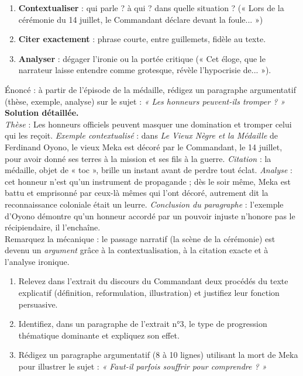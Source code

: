 \documentclass[11pt]{article}
\begin{document}
\begin{methode}
\begin{enumerate}
\item \textbf{Contextualiser} : qui parle ? à qui ? dans quelle situation ? (« Lors de la cérémonie du 14 juillet, le Commandant déclare devant la foule... »)
\item \textbf{Citer exactement} : phrase courte, entre guillemets, fidèle au texte.
\item \textbf{Analyser} : dégager l'ironie ou la portée critique (« Cet éloge, que le narrateur laisse entendre comme grotesque, révèle l'hypocrisie de... »).
\end{enumerate}
\end{methode}

\begin{exoresolu}
Énoncé : à partir de l'épisode de la médaille, rédigez un paragraphe argumentatif (thèse, exemple, analyse) sur le sujet : \emph{« Les honneurs peuvent-ils tromper ? »}
\tcblower
\textbf{Solution détaillée.} \\
\emph{Thèse} : Les honneurs officiels peuvent masquer une domination et tromper celui qui les reçoit. \emph{Exemple contextualisé} : dans \emph{Le Vieux Nègre et la Médaille} de Ferdinand Oyono, le vieux Meka est décoré par le Commandant, le 14 juillet, pour avoir donné ses terres à la mission et ses fils à la guerre. \emph{Citation} : la médaille, objet de « toc », brille un instant avant de perdre tout éclat. \emph{Analyse} : cet honneur n'est qu'un instrument de propagande ; dès le soir même, Meka est battu et emprisonné par ceux-là mêmes qui l'ont décoré, autrement dit la reconnaissance coloniale était un leurre. \emph{Conclusion du paragraphe} : l'exemple d'Oyono démontre qu'un honneur accordé par un pouvoir injuste n'honore pas le récipiendaire, il l'enchaîne. \\
Remarquez la mécanique : le passage narratif (la scène de la cérémonie) est devenu un \emph{argument} grâce à la contextualisation, à la citation exacte et à l'analyse ironique.
\end{exoresolu}

\begin{exercice}
\begin{enumerate}
\item Relevez dans l'extrait du discours du Commandant deux procédés du texte explicatif (définition, reformulation, illustration) et justifiez leur fonction persuasive.
\item Identifiez, dans un paragraphe de l'extrait n°3, le type de progression thématique dominante et expliquez son effet.
\item Rédigez un paragraphe argumentatif (8 à 10 lignes) utilisant la mort de Meka pour illustrer le sujet : \emph{« Faut-il parfois souffrir pour comprendre ? »}
\end{enumerate}
\end{exercice}
\end{document}
